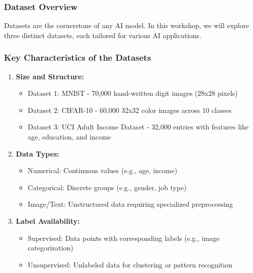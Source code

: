 \documentclass{beamer}
\begin{document}
\begin{frame}[fragile]
    \frametitle{Dataset Overview}
    Datasets are the cornerstone of any AI model. In this workshop, we will explore three distinct datasets, each tailored for various AI applications. 
\end{frame}

\begin{frame}[fragile]
    \frametitle{Key Characteristics of the Datasets}
    \begin{enumerate}
        \item \textbf{Size and Structure:}
            \begin{itemize}
                \item Dataset 1: MNIST - 70,000 hand-written digit images (28x28 pixels)
                \item Dataset 2: CIFAR-10 - 60,000 32x32 color images across 10 classes
                \item Dataset 3: UCI Adult Income Dataset - 32,000 entries with features like age, education, and income
            \end{itemize}
        \item \textbf{Data Types:}
            \begin{itemize}
                \item Numerical: Continuous values (e.g., age, income)
                \item Categorical: Discrete groups (e.g., gender, job type)
                \item Image/Text: Unstructured data requiring specialized preprocessing
            \end{itemize}
        \item \textbf{Label Availability:}
            \begin{itemize}
                \item Supervised: Data points with corresponding labels (e.g., image categorization)
                \item Unsupervised: Unlabeled data for clustering or pattern recognition
            \end{itemize}
    \end{enumerate}
\end{frame}
\end{document}
